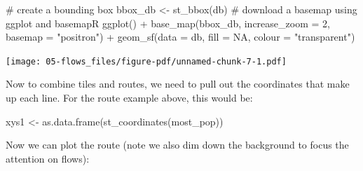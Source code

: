 \documentclass[
  letterpaper,
  DIV=11,
  numbers=noendperiod,
  oneside]{scrreprt}
\newenvironment{Shaded}{\begin{snugshade}}{\end{snugshade}}
\newcommand{\AttributeTok}[1]{\textcolor[rgb]{0.40,0.45,0.13}{#1}}
\newcommand{\CommentTok}[1]{\textcolor[rgb]{0.37,0.37,0.37}{#1}}
\newcommand{\ConstantTok}[1]{\textcolor[rgb]{0.56,0.35,0.01}{#1}}
\newcommand{\DecValTok}[1]{\textcolor[rgb]{0.68,0.00,0.00}{#1}}
\newcommand{\FunctionTok}[1]{\textcolor[rgb]{0.28,0.35,0.67}{#1}}
\newcommand{\NormalTok}[1]{\textcolor[rgb]{0.00,0.23,0.31}{#1}}
\newcommand{\OtherTok}[1]{\textcolor[rgb]{0.00,0.23,0.31}{#1}}
\newcommand{\SpecialCharTok}[1]{\textcolor[rgb]{0.37,0.37,0.37}{#1}}
\newcommand{\StringTok}[1]{\textcolor[rgb]{0.13,0.47,0.30}{#1}}
\begin{document}
\begin{Shaded}
\begin{Highlighting}[]
\CommentTok{\# create a bounding box}
\NormalTok{bbox\_db }\OtherTok{\textless{}{-}} \FunctionTok{st\_bbox}\NormalTok{(db)}
\CommentTok{\# download a basemap using ggplot and basemapR}
\FunctionTok{ggplot}\NormalTok{() }\SpecialCharTok{+}
  \FunctionTok{base\_map}\NormalTok{(bbox\_db, }\AttributeTok{increase\_zoom =} \DecValTok{2}\NormalTok{, }\AttributeTok{basemap =} \StringTok{"positron"}\NormalTok{) }\SpecialCharTok{+}
  \FunctionTok{geom\_sf}\NormalTok{(}\AttributeTok{data =}\NormalTok{ db, }\AttributeTok{fill =} \ConstantTok{NA}\NormalTok{, }\AttributeTok{colour =} \StringTok{"transparent"}\NormalTok{) }
\end{Highlighting}
\end{Shaded}

\texttt{[image: 05-flows\_files/figure-pdf/unnamed-chunk-7-1.pdf]}

Now to combine tiles and routes, we need to pull out the coordinates
that make up each line. For the route example above, this would be:

\begin{Shaded}
\begin{Highlighting}[]
\NormalTok{xys1 }\OtherTok{\textless{}{-}} \FunctionTok{as.data.frame}\NormalTok{(}\FunctionTok{st\_coordinates}\NormalTok{(most\_pop))}
\end{Highlighting}
\end{Shaded}

Now we can plot the route (note we also dim down the background to focus
the attention on flows):

\end{document}
